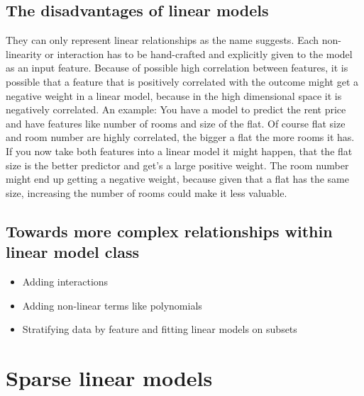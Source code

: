 \documentclass[12pt,]{krantz}
\providecommand{\tightlist}{%
  \setlength{\itemsep}{0pt}\setlength{\parskip}{0pt}}
\theoremstyle{definition}
\theoremstyle{definition}
\theoremstyle{definition}
\theoremstyle{remark}
\begin{document}
\subsection{The disadvantages of linear
models}\label{the-disadvantages-of-linear-models}

They can only represent linear relationships as the name suggests. Each
non-linearity or interaction has to be hand-crafted and explicitly given
to the model as an input feature. Because of possible high correlation
between features, it is possible that a feature that is positively
correlated with the outcome might get a negative weight in a linear
model, because in the high dimensional space it is negatively
correlated. An example: You have a model to predict the rent price and
have features like number of rooms and size of the flat. Of course flat
size and room number are highly correlated, the bigger a flat the more
rooms it has. If you now take both features into a linear model it might
happen, that the flat size is the better predictor and get's a large
positive weight. The room number might end up getting a negative weight,
because given that a flat has the same size, increasing the number of
rooms could make it less valuable.

\subsection{Towards more complex relationships within linear model
class}\label{towards-more-complex-relationships-within-linear-model-class}

\begin{itemize}
\tightlist
\item
  Adding interactions
\item
  Adding non-linear terms like polynomials
\item
  Stratifying data by feature and fitting linear models on subsets
\end{itemize}

\section{Sparse linear models}\label{sparse-linear-models}
\end{document}
